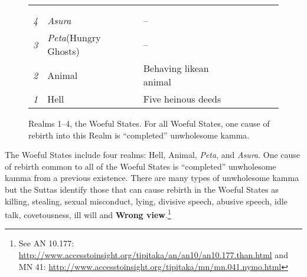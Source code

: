 \begin{figure}[H]
\centering
\renewcommand{\arraystretch}{1.1}
\setlength{\tabcolsep}{0mm}
\noindent\begin{tabular}{L{0.05\textwidth} C{0.2\textwidth} C{0.22\textwidth} C{0.15\textwidth} C{0.2\textwidth} C{0.09\textwidth} C{0.09\textwidth}}
\toprule
 & 
 & 
 & 
 & 
 & 
 \\
 & & & & &  & 
 \\
\midrule
\textit{4}
& \textit{Asura} & -- & 
& 
& 
& 
\\[6mm]
\textit{3} & \textit{Peta}\newline (Hungry Ghosts) & -- & & & &
\\[6mm]
\textit{2} & Animal & Behaving like\newline an animal & & & &
\\[6mm]
\textit{1} & Hell & Five heinous deeds & & & &
\\[6mm]
\bottomrule
\end{tabular}

\caption{Realms 1--4, the Woeful States. For all Woeful States, one cause of rebirth into this Realm is ``completed'' unwholesome kamma.}
\label{fig:Woeful1}
\end{figure}

The Woeful States include four realms: Hell, Animal, \textit{Peta}, and \textit{Asura}. One cause of rebirth common to all of the Woeful States is “completed” unwholesome kamma from a previous existence. There are many types of unwholesome kamma but the Suttas identify those that can cause rebirth in the Woeful States as killing, stealing, sexual misconduct, lying, divisive speech, abusive speech, idle talk, covetousness, ill will and \textbf{Wrong view}.\footnote{See AN 10.177: \url{http://www.accesstoinsight.org/tipitaka/an/an10/an10.177.than.html} and MN 41: \url{http://www.accesstoinsight.org/tipitaka/mn/mn.041.nymo.html}}

